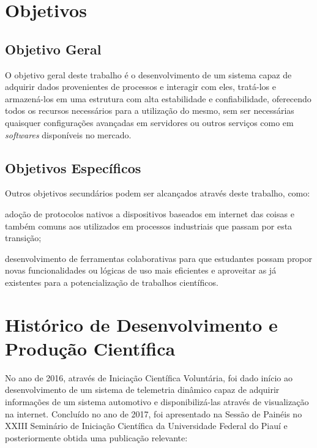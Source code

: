 \section{Objetivos}
\label{sec:objetivos}

\subsection{Objetivo Geral}
\label{sec:objetivo-geral}

O objetivo geral deste trabalho é o desenvolvimento de um sistema capaz de adquirir dados provenientes de processos e interagir com eles, tratá-los e armazená-los em uma estrutura com alta estabilidade e confiabilidade, oferecendo todos os recursos necessários para a utilização do mesmo, sem ser necessárias quaisquer configurações avançadas em servidores ou outros serviços como em  \textit{softwares} disponíveis no mercado.

\subsection{Objetivos Específicos}
\label{sec:objetivos-especificos}

Outros objetivos secundários podem ser alcançados através deste trabalho, como:

\begin{alineascomponto}
	\item adoção de protocolos nativos a dispositivos baseados em internet das coisas e também comuns aos utilizados em processos industriais que passam por esta transição;
    \item desenvolvimento de ferramentas colaborativas para que estudantes possam propor novas funcionalidades ou lógicas de uso mais eficientes e aproveitar as já existentes para a potencialização de trabalhos científicos.
\end{alineascomponto}

\section{Histórico de Desenvolvimento e Produção Científica}
\label{sec:historico-producao}

No ano de 2016, através de Iniciação Científica Voluntária, foi dado início ao desenvolvimento de um sistema de telemetria dinâmico capaz de adquirir informações de um sistema automotivo e disponibilizá-las através de visualização na internet. Concluído no ano de 2017, foi apresentado na Sessão de Painéis no XXIII Seminário de Iniciação Científica da Universidade Federal do Piauí e posteriormente obtida uma publicação relevante:

